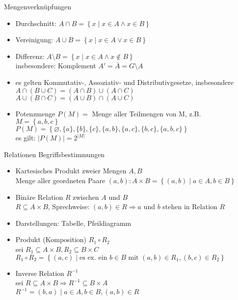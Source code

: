 \begin{frame}{Mengenverknüpfungen}
	\begin{itemize}
		\item Durchschnitt: $A \cap B = \left\{x \mid x \in A \land x \in B\right\}$
		\item Vereinigung: $A \cup B = \left\{x \mid x \in A \lor x \in B\right\}$
		\item Differenz: $A \setminus B = \left\{x \mid x \in A \land x \notin B\right\}$\\
			insbesondere: Komplement $A'= \bar{A} = G \setminus A$
		\item es gelten Kommutativ-, Assoziativ- und Distributivgesetze, insbesondere\\
			$A \cap \left(B \cup C\right) = \left(A \cap B\right) \cup \left(A \cap C\right)$\\
			$A \cup \left(B \cap C\right) = \left(A \cup B\right) \cap \left(A \cup C\right)$
		\item Potenzmenge $P(M) =$ Menge aller Teilmengen von M, z.B.\\
			$M=\left\{a, b, c\right\}$\\
			$P(M)=\left\{\varnothing, \{a\}, \{b\}, \{c\}, \{a,b\}, \{a,c\}, \{b,c\}, \{a,b,c\}\right\}$\\
			es gilt: $|P(M)|=2^{|M|}$
	\end{itemize}
\end{frame}

\begin{frame}{Relationen}
	Begriffsbestimmungen
	\begin{itemize}
		\item Kartesisches Produkt zweier Mengen $A, B$\\
			Menge aller geordneten Paare $(a,b): A \times B = \left\{(a,b) \mid a \in A, b \in B\right\}$
		\item Binäre Relation $R$ zwischen $A$ und $B$\\
			$R \subseteq A \times B$, Sprechweise: $(a,b) \in R \Rightarrow a$ und $b$ stehen in Relation $R$
		\item Darstellungen: Tabelle, Pfeildiagramm
		\item Produkt (Komposition) $R_1 \circ R_2$\\
			sei $R_1 \subseteq A \times B, R_2 \subseteq B \times C$\\
			$R_1 \circ R_2 = \left\{(a,c) \mid \textrm{es ex. ein } b \in B \textrm{ mit } (a,b) \in R_1, (b,c) \in R_2\right\}$
		\item Inverse Relation $R^{-1}$\\
			sei $R \subseteq A \times B \Rightarrow R^{-1}\subseteq B \times A$\\
			$R^{-1}=(b,a) \mid a \in A, b \in B, (a,b) \in R$
	\end{itemize}
\end{frame}